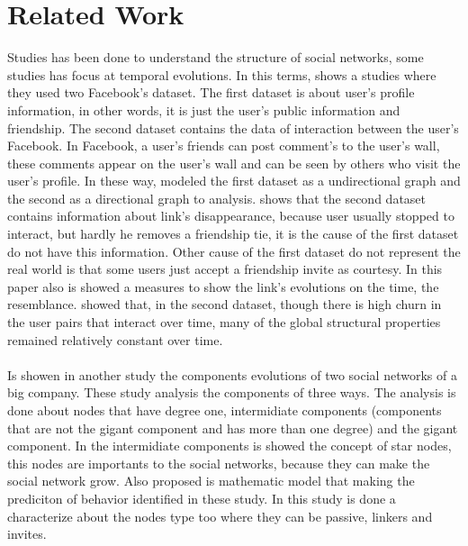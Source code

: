 \section{Related Work}






Studies has been done to understand the structure of social networks, some studies has focus at temporal evolutions. 
In this terms, \cite{Viswanath:2009} shows a studies where they used two Facebook's dataset. 
The first dataset is about user's profile information, in other words, it is just the user's public information 
and friendship. 
The second dataset contains the data of interaction between the user's Facebook. In Facebook, a user's friends 
can post comment's to the user's wall, these comments appear on the user's wall and can be seen  by others who 
visit the user's profile. 
In these way, \cite{Viswanath:2009} modeled the first dataset as a undirectional graph and the second as a directional 
graph to analysis.
\cite{Viswanath:2009} shows that the second dataset contains information about link's disappearance, because user 
usually stopped to interact, but hardly he removes a friendship tie, it is the cause of the first dataset do not have 
this information. Other cause of the first dataset do not represent the real world is that some users just accept a 
friendship invite as courtesy. In this paper also is showed a measures to show the link's evolutions on the time, 
the resemblance.
\cite{Viswanath:2009} showed that, in the second dataset, though there is high churn in the user pairs that interact 
over time, many of the global structural properties remained relatively constant over time.\\
\\
Is showen in another study \cite{Kumar:2006} the components evolutions of two social networks of a big company. These 
study analysis the components of three ways. The analysis is done about nodes that have degree one, intermidiate components 
(components that are not the gigant component and has more than one degree) and the gigant component. In the intermidiate 
components is showed the concept of star nodes, this nodes are importants to the social networks, because they can make 
the social network grow. Also proposed is mathematic model that making the prediciton of behavior identified in these 
study. In this study \cite{Kumar:2006} is done a characterize about the nodes type too where they can be passive, 
linkers and invites.
\\
\cite{Sun:2012} \\
\cite{Ducheneaut:2007} \\
\cite{Backstrom:2006} \\
\cite{Patil:2012} \\
\cite{Lopes:2011} \\
\cite{Sachan:2012} \\
\cite{Leskovec:2005} \\
\cite{Xu:2010} \\
\cite{Willinger:2010} \\
\cite{Wu:2009} \\
\cite{Huang:2008} \\
\cite{Garg:2009} \\
\cite{Leskovec:2008} \\




